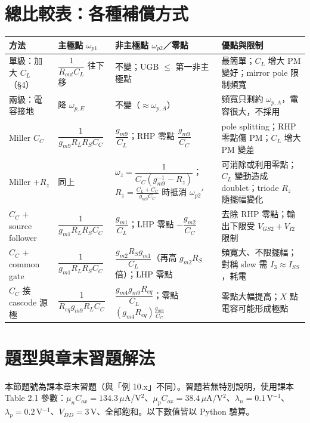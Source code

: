 \documentclass[11pt,a4paper]{article}
\begin{document}
\section{總比較表：各種補償方式}

\begin{tabularx}{\linewidth}{>{\raggedright}p{2.3cm}>{\raggedright}p{3.2cm}>{\raggedright}p{3.6cm}X}
\toprule
方法 & 主極點 $\omega_{p1}$ & 非主極點 $\omega_{p2}$／零點 & 優點與限制\tabularnewline\midrule
單級：加大 $C_L$（\S4） & $\dfrac{1}{R_{out}C_L}$ 往下移 & 不變；UGB $\le$ 第一非主極點 & 最簡單；$C_L$ 增大 PM 變好；mirror pole 限制頻寬\tabularnewline
兩級：電容接地 & 降 $\omega_{p,E}$ & 不變（$\approx\omega_{p,A}$） & 頻寬只剩約 $\omega_{p,A}$，電容很大，不採用\tabularnewline
Miller $C_C$ & $\dfrac{1}{g_{m9}R_LR_SC_C}$ & $\dfrac{g_{m9}}{C_L}$；RHP 零點 $\dfrac{g_{m9}}{C_C}$ & pole splitting；RHP 零點傷 PM；$C_L$ 增大 PM 變差\tabularnewline
Miller $+R_z$ & 同上 & $\omega_z=\dfrac{1}{C_C(g_{m9}^{-1}-R_z)}$；\newline $R_z=\frac{C_L+C_C}{g_{m9}C_C}$ 時抵消 $\omega_{p2}'$ & 可消除或利用零點；$C_L$ 變動造成 doublet；triode $R_z$ 隨擺幅變化\tabularnewline
$C_C$ + source follower & $\dfrac{1}{g_{m1}R_LR_SC_C}$ & $\dfrac{g_{m1}}{C_L}$；LHP 零點 $-\dfrac{g_{m2}}{C_C}$ & 去除 RHP 零點；輸出下限受 $V_{GS2}+V_{I2}$ 限制\tabularnewline
$C_C$ + common gate & $\dfrac{1}{g_{m1}R_LR_SC_C}$ & $\dfrac{g_{m2}R_Sg_{m1}}{C_L}$（再高 $g_{m2}R_S$ 倍）；LHP 零點 & 頻寬大、不限擺幅；對稱 slew 需 $I_3\approx I_{SS}$，耗電\tabularnewline
$C_C$ 接 cascode 源極 & $\dfrac{1}{R_{eq}g_{m9}R_LC_C}$ & $\dfrac{g_{m4}g_{m9}R_{eq}}{C_L}$；零點 $(g_{m4}R_{eq})\frac{g_{m9}}{C_C}$ & 零點大幅提高；$X$ 點電容可能形成極點\tabularnewline
\bottomrule
\end{tabularx}

\section{題型與章末習題解法}\label{sec:problems}

本節題號為課本章末習題（與「例 10.x」不同）。習題若無特別說明，使用課本 Table 2.1 參數：$\mu_nC_{ox}=134.3\,\mu$A/V$^2$、$\mu_pC_{ox}=38.4\,\mu$A/V$^2$、$\lambda_n=0.1$\,V$^{-1}$、$\lambda_p=0.2$\,V$^{-1}$、$V_{DD}=3$\,V、全部飽和。以下數值皆以 Python 驗算。
\end{document}
